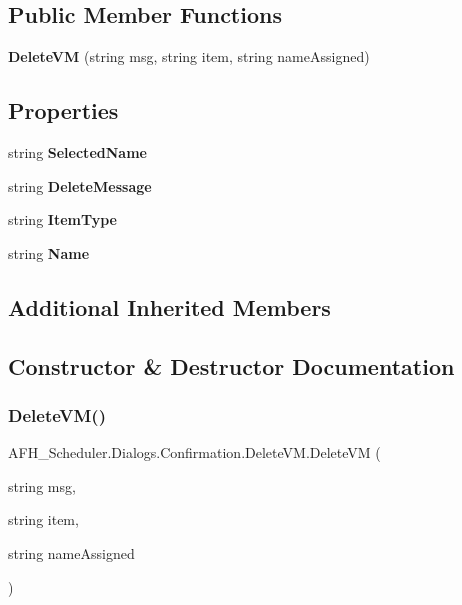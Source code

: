 \subsection*{Public Member Functions}
\begin{DoxyCompactItemize}
\item 
\textbf{ Delete\+VM} (string msg, string item, string name\+Assigned)
\end{DoxyCompactItemize}
\subsection*{Properties}
\begin{DoxyCompactItemize}
\item 
string \textbf{ Selected\+Name}\hspace{0.3cm}{\ttfamily  [get, set]}
\item 
string \textbf{ Delete\+Message}\hspace{0.3cm}{\ttfamily  [get, set]}
\item 
string \textbf{ Item\+Type}\hspace{0.3cm}{\ttfamily  [get, set]}
\item 
string \textbf{ Name}\hspace{0.3cm}{\ttfamily  [get]}
\end{DoxyCompactItemize}
\subsection*{Additional Inherited Members}


\subsection{Constructor \& Destructor Documentation}
\mbox{\label{class_a_f_h___scheduler_1_1_dialogs_1_1_confirmation_1_1_delete_v_m_abe9b6638e224ee974e8f6cf61f362ea6}} 
\subsubsection{DeleteVM()}
{\footnotesize\ttfamily A\+F\+H\+\_\+\+Scheduler.\+Dialogs.\+Confirmation.\+Delete\+V\+M.\+Delete\+VM (\begin{DoxyParamCaption}\item[{string}]{msg,  }\item[{string}]{item,  }\item[{string}]{name\+Assigned }\end{DoxyParamCaption})}



